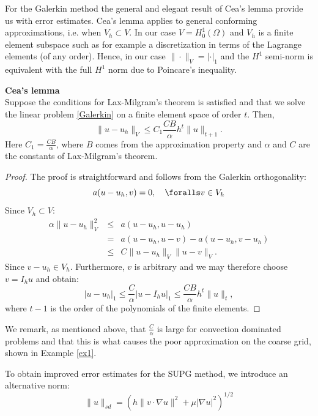 For the Galerkin method the general and elegant result of Cea's lemma
provide us with error estimates. Cea's lemma applies to general 
conforming approximations, i.e. when $V_h \subset V$. In our
case $V=H_0^1(\Omega)$ and $V_h$ is a finite element subspace such 
as for example  a discretization in terms of the Lagrange elements (of any order). Hence, in our case 
$\|\cdot\|_V= |\cdot|_1$ and the $H^1$ semi-norm is equivalent with the full 
$H^1$ norm due to Poincare's inequality. 

\begin{theorem}{\textbf{Cea's lemma}} \\
Suppose the conditions for Lax-Milgram's theorem is satisfied and that
we solve the linear problem \eqref{Galerkin} on a finite element space
of order $t$. Then,     
\[
\|u-u_h\|_V     \leqslant C_1 \frac{C B}{\alpha}  h^{t} \|u\|_{t+1}.   
\]
Here $C_1 = \frac{C B}{\alpha}$, where $B$ comes from the approximation property 
and $\alpha$ and $C$ are the constants of Lax-Milgram's theorem.    
\end{theorem}

\begin{proof}
The proof is straightforward and follows from the Galerkin orthogonality: 
\[
a(u - u_h, v) = 0, \quad \foralls v \in V_h 
\]
Since $V_h \subset V$: 
\begin{eqnarray*}
\alpha \|u-u_h\|^2_{V} &\le& a(u-u_h, u-u_h)    \\ 
 &=& a(u-u_h, u-v) - a(u-u_h, v-u_h) \\ 
 &\le& C \|u-u_h\|_V \| u-v\|_V  .      
\end{eqnarray*}
Since $v-u_h\in V_h$. Furthermore,  $v$ is arbitrary and we may therefore choose $v = I_h u$ and obtain:  
\[
	|u-u_h|_1 \leqslant \frac{C}{\alpha} |u - I_h u|_1 \le  \frac{CB}{\alpha} h^{t} \|u\|_t,   
\]
where $t-1$ is the order of the polynomials of the finite elements. 
\end{proof}

We remark, as mentioned above, that 
$\frac{C}{\alpha}$ is large for convection dominated problems and that this is what
causes the poor approximation on the coarse grid, shown in Example \ref{ex1}.  


To obtain improved error estimates for the SUPG method, we introduce  
an alternative norm: 
\begin{equation}
\label{supg:norm}
\|u\|_{sd} = \left(h\|v\cdot\nabla u\|^2 +  \mu |\nabla u|^2\right)^{1/2}
\end{equation}


